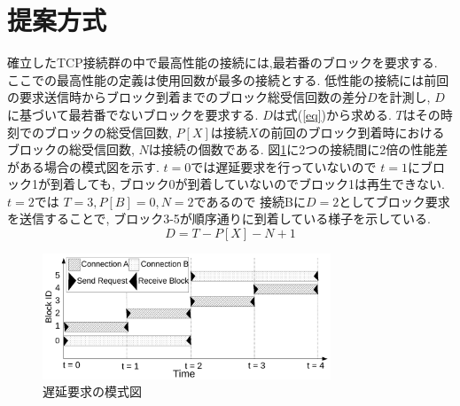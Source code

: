 \documentclass{ltjsarticle}
\begin{document}
\section{提案方式}
\vspace{-2.75mm}
確立したTCP接続群の中で最高性能の接続には,最若番のブロックを要求する.
ここでの最高性能の定義は使用回数が最多の接続とする.
低性能の接続には前回の要求送信時からブロック到着までのブロック総受信回数の差分\begin{math}D\end{math}を計測し,
\begin{math}D\end{math}に基づいて最若番でないブロックを要求する.
\begin{math}D\end{math}は式(\ref{eq})から求める.
\begin{math}T\end{math}はその時刻でのブロックの総受信回数,
\begin{math}P[X]\end{math}は接続\begin{math}X\end{math}の前回のブロック到着時におけるブロックの総受信回数,
\begin{math}N\end{math}は接続の個数である.
図\ref{delay}に2つの接続間に2倍の性能差がある場合の模式図を示す.
\begin{math}t=0\end{math}では遅延要求を行っていないので
\begin{math}t=1\end{math}にブロック1が到着しても,
ブロック0が到着していないのでブロック1は再生できない.
\begin{math}t=2\end{math}では
\begin{math}T=3, P[B]=0, N=2\end{math}であるので
接続Bに\begin{math}D=2\end{math}としてブロック要求を送信することで,
ブロック3-5が順序通りに到着している様子を示している.
\vspace{-2.75mm}
\begin{equation}
	\label{eq}
	D = T - P[X] - N + 1
\end{equation}
\vspace{-7.75mm}
\begin{figure}[h]
	\centering
	\includegraphics[width=8.6cm]{figure/delay.pdf}
	\vspace{-3mm}
	\caption{遅延要求の模式図}
	\label{delay}
\end{figure}
\vspace{-12mm}
\end{document}
